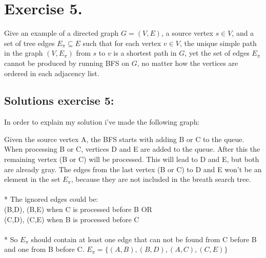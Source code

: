 \documentclass{article}
\begin{document}
\newpage
\section*{Exercise 5.}

Give an example of a directed graph $G = (V,E)$, a source vertex $s \in V$, and a set of tree edges $E_{\pi} \subseteq E$ such that for each vertex $v \in V$, the unique simple path
in the graph $(V, E_{\pi})$ from $s$ to $v$ is a shortest path in $G$, yet the set of edges $E_{\pi}$ cannot be produced by running BFS on $G$, no matter how the vertices are ordered
in each adjacency list.

\subsection*{Solutions exercise 5:}
In order to explain my solution i've made the following graph:

\newline
Given the source vertex A, the BFS starts with adding B or C to the queue. When processing B or C, vertices D and E are added to the queue. After this the remaining vertex (B or C) will be processed. This will lead to D and E, but both are already gray. The edges from the last vertex (B or C) to D and E won't be an element in the set $E_\pi$, because they are not included in the breath search tree.\\
\\*
The ignored edges could be: \\
(B,D), (B,E) when C is processed before B OR\\
(C,D), (C,E) when B is processed before C\\
\\*
So $E_\pi$ should contain at least one edge that can not be found from C before B and one from B before C.
$E_\pi = \{(A,B), (B,D), (A,C), (C,E)\} $
\end{document}

